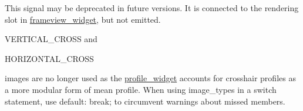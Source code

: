 
\begin{DoxyRefList}
\item[\label{deprecated__deprecated000001}%
\hypertarget{deprecated__deprecated000001}{}%
Member \hyperlink{classframeWorker_aadb9de42063c57313039892dcf07bbb0}{frame\+Worker\+:\+:new\+Frame\+Available} ()]This signal may be deprecated in future versions. It is connected to the rendering slot in \hyperlink{classframeview__widget}{frameview\+\_\+widget}, but not emitted.  
\item[\label{deprecated__deprecated000002}%
\hypertarget{deprecated__deprecated000002}{}%
File \hyperlink{image__type_8h}{image\+\_\+type.h} ]V\+E\+R\+T\+I\+C\+A\+L\+\_\+\+C\+R\+O\+S\+S and 

H\+O\+R\+I\+Z\+O\+N\+T\+A\+L\+\_\+\+C\+R\+O\+S\+S 

images are no longer used as the \hyperlink{classprofile__widget}{profile\+\_\+widget} accounts for crosshair profiles as a more modular form of mean profile. When using image\+\_\+types in a switch statement, use default\+: break; to circumvent warnings about missed members. 
\end{DoxyRefList}